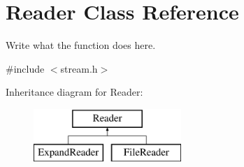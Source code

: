\hypertarget{classReader}{\section{Reader Class Reference}
\label{classReader}
}


Write what the function does here.  




{\ttfamily \#include $<$stream.\+h$>$}

Inheritance diagram for Reader\+:\begin{figure}[H]
\begin{center}
\leavevmode
\includegraphics[height=2.000000cm]{classReader}
\end{center}
\end{figure}
